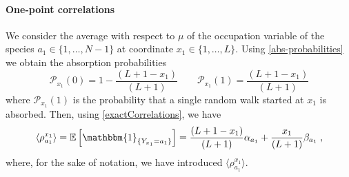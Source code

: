 \documentclass[10pt]{article}
\numberwithin{equation}{section}
\numberwithin{equation}{subsection}
\newcommand{\co}{\;,}
\newcommand{\dt}{\;.}
\begin{document}
\paragraph{One-point correlations}
We consider the average with respect to $\mu$ of the occupation variable of the species $a_{1}\in \{1,\ldots,N-1\}$ at coordinate $x_{1}\in \{1,\ldots,L\}$. %
Using \eqref{abs-probabilities} we obtain the absorption probabilities 
\begin{equation}
	\mathcal{P}_{x_1}(0)=1-\frac{(L+1-x_{1})}{(L+1)}\qquad \mathcal{P}_{x_1}(1)=\frac{(L+1-x_{1})}{(L+1)}
\end{equation} 
where $\mathcal{P}_{x_1}(1)$ is the probability that a single random walk started at $x_1$ is absorbed. Then, using \eqref{exactCorrelations}, we have
\begin{equation}\label{one-pts-corr}
		\langle\rho_{a_{1}}^{x_{1}}\rangle= \mathbb{E}\left[\mathbbm{1}_{\{Y_{x_{1}}=a_{1}\}}\right]=\frac{(L+1-x_{1})}{(L+1)}\alpha_{a_{1}}+\frac{x_{1}}{(L+1)}\beta_{a_{1}}\co
\end{equation} 
{\color{blue}where, for the sake of notation, we have introduced $\langle\rho_{a_{1}}^{x_{1}}\rangle$.}
\end{document}
